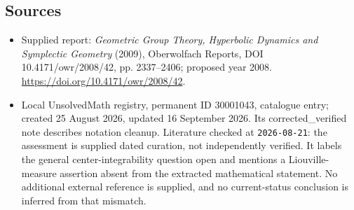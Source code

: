 \documentclass[11pt]{article}
\begin{document}
\subsection{Sources}
\begin{itemize}
\item Supplied report: \emph{Geometric Group Theory, Hyperbolic Dynamics and Symplectic Geometry} (2009), Oberwolfach Reports, DOI 10.4171/owr/2008/42, pp. 2337--2406; proposed year 2008. \url{https://doi.org/10.4171/owr/2008/42}.
\item Local UnsolvedMath registry, permanent ID 30001043, catalogue entry; created 25 August 2026, updated 16 September 2026. Its corrected\_verified note describes notation cleanup. Literature checked at \texttt{2026-08-21}: the assessment is supplied dated curation, not independently verified. It labels the general center-integrability question open and mentions a Liouville-measure assertion absent from the extracted mathematical statement. No additional external reference is supplied, and no current-status conclusion is inferred from that mismatch.
\end{itemize}
\end{document}
